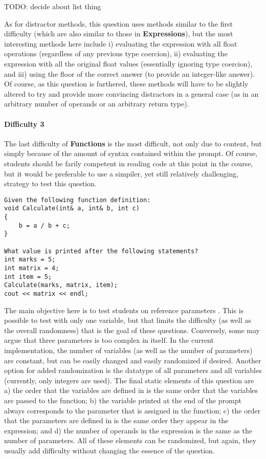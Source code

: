 \documentclass{article}
\begin{document}
TODO: decide about list thing

As for distractor methods, this question uses methods similar to the first difficulty (which are also similar to those in \textbf{Expressions}), but the most interesting methods here include i) evaluating the expression with all float operations (regardless of any previous type coercion), ii) evaluating the expression with all the original float values (essentially ignoring type coercion), and iii) using the floor of the correct answer (to provide an integer-like answer). Of course, as this question is furthered, these methods will have to be slightly altered to try and provide more convincing distractors in a general case (as in an arbitrary number of operands or an arbitrary return type).

\paragraph{Difficulty 3} \hfill \par

The last difficulty of \textbf{Functions} is the most difficult, not only due to content, but simply because of the amount of syntax contained within the prompt. Of course, students should be farily competent in reading code at this point in the course, but it would be preferable to use a simpiler, yet still relatively challenging, strategy to test this question.

\begin{lstlisting}
Given the following function definition:
void Calculate(int& a, int& b, int c)
{
	b = a / b + c;
}

What value is printed after the following statements?
int marks = 5;
int matrix = 4;
int item = 5;
Calculate(marks, matrix, item);
cout << matrix << endl;
\end{lstlisting}


The main objective here is to test students on reference parameters . This is possible to test with only one variable, but that limits the difficulty (as well as the overall randomness) that is the goal of these questions. Conversely, some may argue that three parameters is too complex in itself. In the current implementation, the number of variables (as well as the number of parameters) are constant, but can be easily changed and easily randomized if desired. Another option for added randomization is the datatype of all parameters and all variables (currently, only integers are used). The final static elements of this question are a) the order that the variables are defined in is the same order that the variables are passed to the function; b) the variable printed at the end of the prompt always corresponds to the parameter that is assigned in the function; c) the order that the parameters are defined in is the same order they appear in the expression; and d) the number of operands in the expression is the same as the number of parameters. All of these elements can be randomized, but again, they usually add difficulty without changing the essence of the question. 
\end{document}

